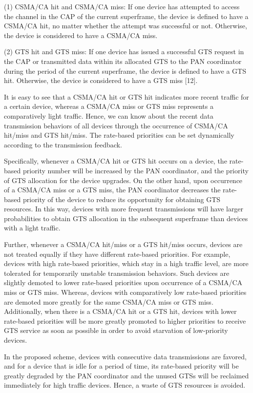 \documentclass[letterpaper]{sig-alternate-10pt}
\begin{document}
(1)	CSMA/CA hit and CSMA/CA miss: If one device has attempted to access the channel in the CAP of the current superframe, the device is defined to have a CSMA/CA hit, no matter whether the attempt was successful or not. Otherwise, the device is considered to have a CSMA/CA miss.

(2)	GTS hit and GTS miss: If one device has issued a successful GTS request in the CAP or transmitted data within its allocated GTS to the PAN coordinator during the period of the current superframe, the device is defined to have a GTS hit. Otherwise, the device is considered to have a GTS miss [12].

It is easy to see that a CSMA/CA hit or GTS hit indicates more recent traffic for a certain device, whereas a CSMA/CA miss or GTS miss represents a comparatively light traffic. Hence, we can know about the recent data transmission behaviors of all devices through the occurrence of CSMA/CA hit/miss and GTS hit/miss. The rate-based priorities can be set dynamically according to the transmission feedback.

Specifically, whenever a CSMA/CA hit or GTS hit occurs on a device, the rate-based priority number will be increased by the PAN coordinator, and the priority of GTS allocation for the device upgrades. On the other hand, upon occurrence of a CSMA/CA miss or a GTS miss, the PAN coordinator decreases the rate-based priority of the device to reduce its opportunity for obtaining GTS resources. In this way, devices with more frequent transmissions will have larger probabilities to obtain GTS allocation in the subsequent superframe than devices with a light traffic.

Further, whenever a CSMA/CA hit/miss or a GTS hit/miss occurs, devices are not treated equally if they have different rate-based priorities. For example, devices with high rate-based priorities, which stay in a high traffic level, are more tolerated for temporarily unstable transmission behaviors. Such devices are slightly demoted to lower rate-based priorities upon occurrence of a CSMA/CA miss or GTS miss. Whereas, devices with comparatively low rate-based priorities are demoted more greatly for the same CSMA/CA miss or GTS miss. Additionally, when there is a CSMA/CA hit or a GTS hit, devices with lower rate-based priorities will be more greatly promoted to higher priorities to receive GTS service as soon as possible in order to avoid starvation of low-priority devices.

In the proposed scheme, devices with consecutive data transmissions are favored, and for a device that is idle for a period of time, its rate-based priority will be greatly degraded by the PAN coordinator and the unused GTSs will be reclaimed immediately for high traffic devices. Hence, a waste of GTS resources is avoided.
\end{document}
